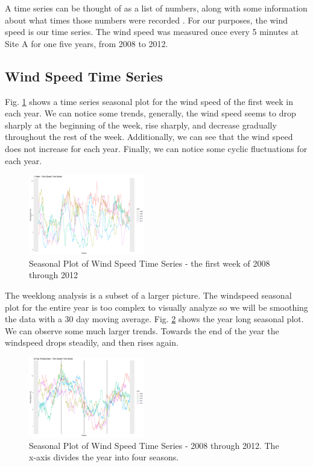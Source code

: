 \documentclass{IEEEtran}
\begin{document}
  A time series can be thought of as a list of numbers, along with some information about what times those numbers were recorded \cite{forecasting}. For our purposes, the wind speed is our time series. The wind speed was measured once every 5 minutes at Site A for one five years, from 2008 to 2012.

  \subsection{Wind Speed Time Series}

  Fig. \ref{fig:seasonal1} shows a time series seasonal plot for the wind speed of the first week in each year. We can notice some trends, generally, the wind speed seems to drop sharply at the beginning of the week, rise sharply, and decrease gradually throughout the rest of the week. Additionally, we can see that the wind speed does not increase for each year. Finally, we can notice some cyclic fluctuations for each year.

  \begin{figure}[ht!]
    \centering
    \includegraphics[width=0.45\textwidth]{figures/seasonalweek}
    \caption{Seasonal Plot of Wind Speed Time Series - the first week of 2008 through 2012}
    \label{fig:seasonal1}
  \end{figure}

  The weeklong analysis is a subset of a larger picture. The windspeed seasonal plot for the entire year is too complex to visually analyze so we will be smoothing the data with a 30 day moving average. Fig. \ref{fig:seasonal2} shows the year long seasonal plot. We can observe some much larger trends. Towards the end of the year the windspeed drops steadily, and then rises again.

  \begin{figure}
    \includegraphics[width=0.45\textwidth]{figures/seasonalyear}
    \caption{Seasonal Plot of Wind Speed Time Series - 2008 through 2012. The x-axis divides the year into four seasons.}
    \label{fig:seasonal2}
  \end{figure}
\end{document}
